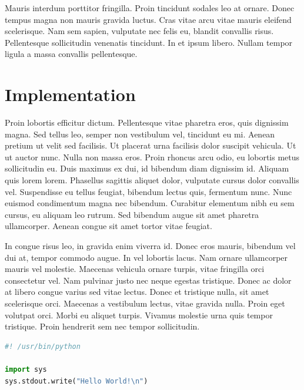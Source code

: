 \documentclass{article}
\begin{document}
Mauris interdum porttitor fringilla. Proin tincidunt sodales leo at ornare. Donec tempus magna non mauris gravida luctus. Cras vitae arcu vitae mauris eleifend scelerisque. Nam sem sapien, vulputate nec felis eu, blandit convallis risus. Pellentesque sollicitudin venenatis tincidunt. In et ipsum libero. Nullam tempor ligula a massa convallis pellentesque.


\section{Implementation}

Proin lobortis efficitur dictum. Pellentesque vitae pharetra eros, quis dignissim magna. Sed tellus leo, semper non vestibulum vel, tincidunt eu mi. Aenean pretium ut velit sed facilisis. Ut placerat urna facilisis dolor suscipit vehicula. Ut ut auctor nunc. Nulla non massa eros. Proin rhoncus arcu odio, eu lobortis metus sollicitudin eu. Duis maximus ex dui, id bibendum diam dignissim id. Aliquam quis lorem lorem. Phasellus sagittis aliquet dolor, vulputate cursus dolor convallis vel. Suspendisse eu tellus feugiat, bibendum lectus quis, fermentum nunc. Nunc euismod condimentum magna nec bibendum. Curabitur elementum nibh eu sem cursus, eu aliquam leo rutrum. Sed bibendum augue sit amet pharetra ullamcorper. Aenean congue sit amet tortor vitae feugiat.

In congue risus leo, in gravida enim viverra id. Donec eros mauris, bibendum vel dui at, tempor commodo augue. In vel lobortis lacus. Nam ornare ullamcorper mauris vel molestie. Maecenas vehicula ornare turpis, vitae fringilla orci consectetur vel. Nam pulvinar justo nec neque egestas tristique. Donec ac dolor at libero congue varius sed vitae lectus. Donec et tristique nulla, sit amet scelerisque orci. Maecenas a vestibulum lectus, vitae gravida nulla. Proin eget volutpat orci. Morbi eu aliquet turpis. Vivamus molestie urna quis tempor tristique. Proin hendrerit sem nec tempor sollicitudin.

\begin{file}[hello.py]
\begin{lstlisting}[language=Python]
#! /usr/bin/python

import sys
sys.stdout.write("Hello World!\n")
\end{lstlisting}
\end{file}
\end{document}
